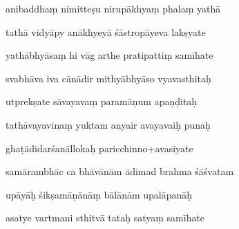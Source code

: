 \documentclass[article,12pt,a4paper]{memoir}%
\newcounter{parCount}
\begin{document}
	  
	  \pstart {} anibaddhaṃ nimitteṣu nirupākhyaṃ phalaṃ yathā 
	{}
	\pend%
      

	  
	  \pstart \leavevmode%
	tathā vidyāpy anākhyeyā śāstropāyeva lakṣyate 
	{}
	\pend%
      

	  
	  \pstart {} yathābhyāsaṃ hi vāg arthe pratipattiṃ samīhate 
	{}
	\pend%
      

	  
	  \pstart \leavevmode%
	svabhāva iva cānādir mithyābhyāso vyavasthitaḥ 
	{}
	\pend%
      

	  
	  \pstart {} utprekṣate sāvayavaṃ paramāṇum apaṇḍitaḥ 
	{}
	\pend%
      

	  
	  \pstart \leavevmode%
	tathāvayavinaṃ yuktam anyair avayavaiḥ punaḥ 
	{}
	\pend%
      

	  
	  \pstart {} ghaṭādidarśanāllokaḥ paricchinno+avasīyate 
	{}
	\pend%
      

	  
	  \pstart \leavevmode%
	samārambhāc ca bhāvānām ādimad brahma śāśvatam 
	{}
	\pend%
      

	  
	  \pstart {} upāyāḥ śikṣamāṇānāṃ bālānām upalāpanāḥ 
	{}
	\pend%
      

	  
	  \pstart \leavevmode%
	asatye vartmani sthitvā tataḥ satyaṃ samīhate 
	{}
	\pend%
      
\end{document}
